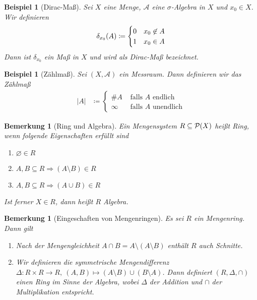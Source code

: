 \documentclass[11pt, twoside, a4paper]{article}
\theoremstyle{plain}
\newtheorem{bemerkung}[blockelement]{Bemerkung}
\newtheorem{beispiel}[blockelement]{Beispiel}
\numberwithin{equation}{subsection}
\newcommand{\pair}[1]{\left(#1\right)}
\newcommand{\of}[1]{\mathopen{}\mathclose{}\bgroup\left(#1\aftergroup\egroup\right)}
\newcommand{\abs}[1]{\left\lvert#1\right\rvert}
\newcommand{\impl}[0]{\Rightarrow{}}
\newcommand{\exclude}[0]{\setminus}
\renewcommand{\emptyset}{\varnothing}
\newcommand{\anf}[1]{\glqq{}#1\grqq}
\newcommand{\mA}{\mathcal{A}}
\begin{document}
    \begin{beispiel}[Dirac-Maß]
        Sei $X$ eine Menge, $\mA$ eine $\sigma$-Algebra in $X$ und $x_0\in X$. Wir definieren
        \begin{align*}
            \delta_{x_0}\of{A} \coloneqq \begin{cases}
                                             0 &x_0\not\in A\\
                                             1 &x_0\in A
            \end{cases}
        \end{align*}
        Dann ist $\delta_{x_0}$ ein Maß in $X$ und wird als \textit{Dirac}-Maß bezeichnet.
    \end{beispiel}

    \begin{beispiel}[Zählmaß]
        Sei $\pair{X, \mA}$ ein Messraum. Dann definieren wir das Zählmaß
        \begin{align*}
            \abs{A} &\coloneqq \begin{cases}
                                   \#A &\text{ falls $A$ endlich}\\
                                   \infty &\text{ falls $A$ unendlich}
            \end{cases}
        \end{align*}
    \end{beispiel}

    \begin{bemerkung}[Ring und Algebra]
        \marginnote{[28. Okt]}
        Ein Mengensystem $R \subseteq\mathcal{P}\of{X}$ heißt Ring, wenn folgende Eigenschaften erfüllt sind
        \begin{enumerate}[label=($\text{R}_{\arabic*}$)]
            \item $\emptyset\in R$
            \item $A, B\subseteq R \impl \pair{A \setminus B} \in R$
            \item $A, B\subseteq R \impl \pair{A \cup B} \in R$
        \end{enumerate}
        Ist ferner $X\in R$, dann heißt $R$ Algebra.
    \end{bemerkung}

    \begin{bemerkung}[Eingeschaften von Mengenringen]
        Es sei $R$ ein Mengenring. Dann gilt
        \begin{enumerate}
            \item Nach der Mengengleichheit $A \cap B = A \exclude \pair{A \exclude B}$ enthält $R$ auch Schnitte.
            \item Wir definieren die symmetrische Mengendifferenz $\Delta: R \times R \to R,~\pair{A, B} \mapsto \pair{A\setminus B} \cup \pair{B\setminus A}$. Dann definiert $\pair{R, \Delta, \cap}$ einen Ring im Sinne der Algebra, wobei $\Delta$ der \anf{Addition} und $\cap$ der \anf{Multiplikation} entspricht.
        \end{enumerate}
    \end{bemerkung}
\end{document}
